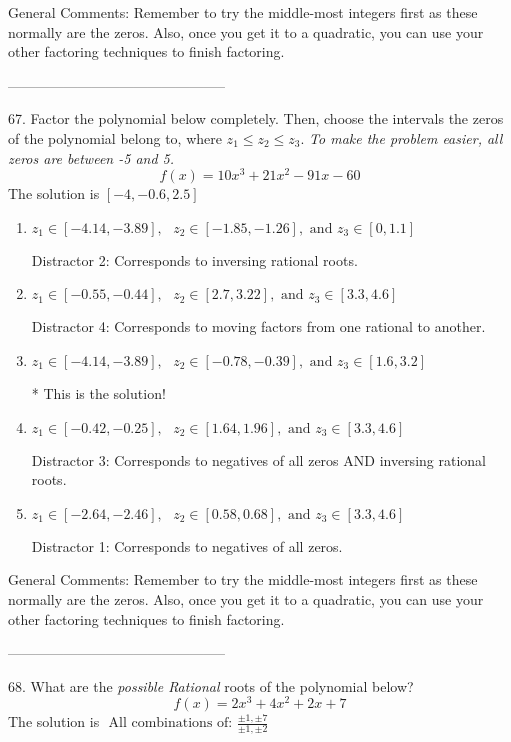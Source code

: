 \documentclass{extbook}[14pt]
\begin{document}
General Comments: Remember to try the middle-most integers first as these normally are the zeros. Also, once you get it to a quadratic, you can use your other factoring techniques to finish factoring.

-----------------------------------------------

67. Factor the polynomial below completely. Then, choose the intervals the zeros of the polynomial belong to, where $z_1 \leq z_2 \leq z_3$. \textit{To make the problem easier, all zeros are between -5 and 5.}
\[ f(x) = 10x^{3} +21 x^{2} -91 x -60 \] 
The solution is $ [-4, -0.6, 2.5] $ 

\begin{enumerate}[label=\Alph*.] 
\item $ z_1 \in [-4.14, -3.89], \text{   }  z_2 \in [-1.85, -1.26], \text{   and   } z_3 \in [0, 1.1] $ 

  Distractor 2: Corresponds to inversing rational roots. 
\item $ z_1 \in [-0.55, -0.44], \text{   }  z_2 \in [2.7, 3.22], \text{   and   } z_3 \in [3.3, 4.6] $ 

  Distractor 4: Corresponds to moving factors from one rational to another. 
\item $ z_1 \in [-4.14, -3.89], \text{   }  z_2 \in [-0.78, -0.39], \text{   and   } z_3 \in [1.6, 3.2] $ 

 * This is the solution! 
\item $ z_1 \in [-0.42, -0.25], \text{   }  z_2 \in [1.64, 1.96], \text{   and   } z_3 \in [3.3, 4.6] $ 

  Distractor 3: Corresponds to negatives of all zeros AND inversing rational roots. 
\item $ z_1 \in [-2.64, -2.46], \text{   }  z_2 \in [0.58, 0.68], \text{   and   } z_3 \in [3.3, 4.6] $ 

  Distractor 1: Corresponds to negatives of all zeros. 
\end{enumerate} 
 
General Comments: Remember to try the middle-most integers first as these normally are the zeros. Also, once you get it to a quadratic, you can use your other factoring techniques to finish factoring.

-----------------------------------------------

68. What are the \textit{possible Rational} roots of the polynomial below?
\[ f(x) = 2x^{3} +4 x^{2} +2 x + 7 \] 
The solution is $ \text{ All combinations of: }\frac{\pm 1,\pm 7}{\pm 1,\pm 2} $ 
\end{document}

